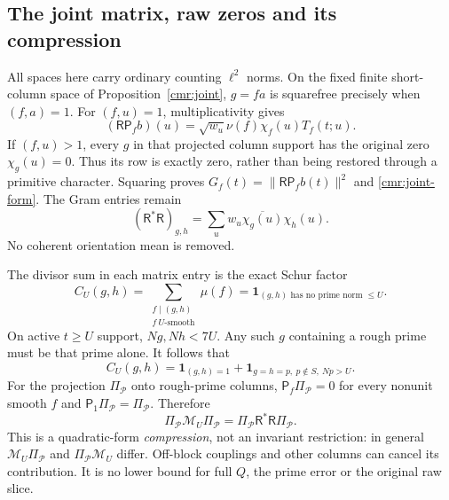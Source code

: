 \subsection{The joint matrix, raw zeros and its compression}
\label{cmr:joint-proof}
All spaces here carry ordinary counting $\ell^2$ norms. On the fixed
finite short-column space of Proposition~\ref{cmr:joint},
$g=fa$ is squarefree precisely when $(f,a)=1$.
For $(f,u)=1$, multiplicativity gives
\[
 (\mathsf R\mathsf P_fb)(u)
   =\sqrt{w_u}\nu(f)\chi_f(u)T_f(t;u).
\]
If $(f,u)>1$, every $g$ in that projected column support has the
original zero $\chi_g(u)=0$. Thus its row is exactly zero, rather
than being restored through a primitive character. Squaring proves
$G_f(t)=\|\mathsf R\mathsf P_fb(t)\|^2$ and
\eqref{cmr:joint-form}. The Gram entries remain
\[
 (\mathsf R^*\mathsf R)_{g,h}
      =\sum_u w_u\overline{\chi_g(u)}\chi_h(u).
\]
No coherent orientation mean is removed.

The divisor sum in each matrix entry is the exact Schur factor
\[
 C_U(g,h)=\sum_{\substack{f\mid(g,h)\\f\ U\text{-smooth}}}\mu(f)
       =\mathbf1_{(g,h)\text{ has no prime norm }\le U}.
\]
On active $t\ge U$ support, $Ng,Nh<7U$. Any such $g$ containing a
rough prime must be that prime alone. It follows that
\begin{equation}\label{cmr:schur}
 C_U(g,h)=\mathbf1_{(g,h)=1}
       +\mathbf1_{g=h=p,\ p\notin S,\ Np>U}.
\end{equation}
For the projection $\Pi_{\mathcal P}$ onto rough-prime columns,
$\mathsf P_f\Pi_{\mathcal P}=0$ for every nonunit smooth $f$ and
$\mathsf P_1\Pi_{\mathcal P}=\Pi_{\mathcal P}$. Therefore
\begin{equation}\label{cmr:compression}
 \Pi_{\mathcal P}\mathcal M_U\Pi_{\mathcal P}
     =\Pi_{\mathcal P}\mathsf R^*\mathsf R\Pi_{\mathcal P}.
\end{equation}
This is a quadratic-form \emph{compression}, not an invariant
restriction: in general $\mathcal M_U\Pi_{\mathcal P}$ and
$\Pi_{\mathcal P}\mathcal M_U$ differ. Off-block couplings and other
columns can cancel its contribution. It is no lower bound for full
$Q$, the prime error or the original raw slice.

